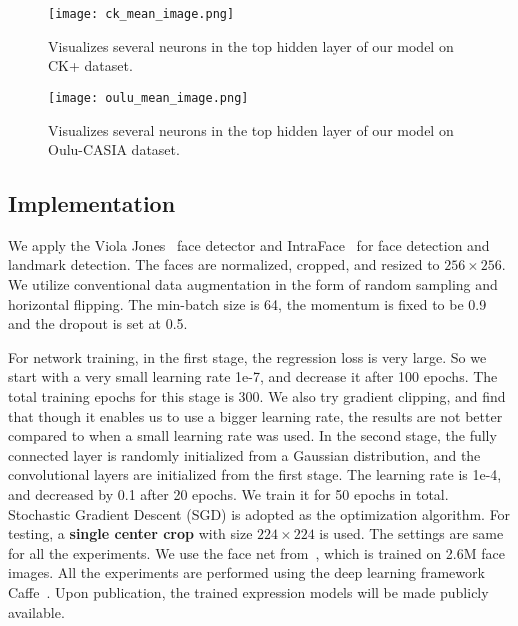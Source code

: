 \documentclass[a4paper, 10pt, conference]{ieeeconf}      %
\begin{document}
\begin{figure}[!ht]
  \centering
  \texttt{[image: ck\_mean\_image.png]}
  \caption{Visualizes several neurons in the top hidden layer of our model on CK+ dataset.}
  \label{figurelabel}
  \vspace{-2mm}
\end{figure}

\begin{figure}[!ht]
  \centering
  \texttt{[image: oulu\_mean\_image.png]}
  \caption{Visualizes several neurons in the top hidden layer of our model on Oulu-CASIA dataset.}
  \label{figurelabel}
  \vspace{-2mm}
\end{figure}

\subsection{Implementation}
We apply the Viola Jones~\cite{viola2004robust} face detector and IntraFace~\cite{de2015intraface} for face detection and landmark detection. The faces are normalized, cropped, and resized to $256 \times 256$. We utilize conventional data augmentation in the form of random sampling and horizontal flipping. The min-batch size is 64, the momentum is fixed to be 0.9 and the dropout is set at 0.5.

For network training, in the first stage, the regression loss is very large. So we start with a very small learning rate 1e-7, and decrease it after 100 epochs. The total training epochs for this stage is 300. We also try gradient clipping, and find that though it enables us to use a bigger learning rate, the results are not better compared to when a small learning rate was used. In the second stage, the fully connected layer is randomly initialized  from a Gaussian distribution, and the convolutional layers are initialized from the first stage. The learning rate is 1e-4, and decreased by 0.1 after 20 epochs. We train it for 50 epochs in total. Stochastic Gradient Descent (SGD) is adopted as the optimization algorithm. For testing, a \textbf{single center crop} with size  $224 \times 224$ is used. The settings are same for all the experiments. We use the face net from~\cite{parkhi2015deep}, which is trained on 2.6M face images. All the experiments are performed using the deep learning framework Caffe~\cite{jia2014caffe}. Upon publication, the trained expression models will be made publicly available.
\end{document}
